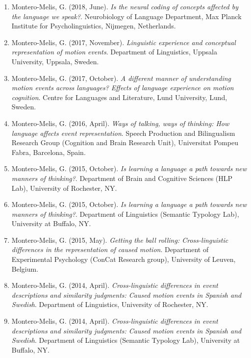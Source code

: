 \documentclass[margin, 11pt]{res} %
\begin{document}
\begin{resume}
\begin{enumerate}
\item Montero-Melis, G. (2018, June). \textit{Is the neural coding of concepts affected by the language we speak?}. Neurobiology of Language Department, Max Planck Institute for Psycholinguistics, Nijmegen, Netherlands.

\item Montero-Melis, G. (2017, November). \textit{Linguistic experience and conceptual representation of motion events}. Department of Linguistics, Uppsala University, Uppsala, Sweden.

\item Montero-Melis, G. (2017, October). \textit{A different manner of understanding motion events across languages? Effects of language experience on motion cognition}. Centre for Languages and Literature, Lund University, Lund, Sweden.

\item Montero-Melis, G. (2016, April). \textit{Ways of talking, ways of thinking: How language affects event representation}. Speech Production and Bilingualism Research Group (Cognition and Brain Research Unit), Universitat Pompeu Fabra, Barcelona, Spain.

\item Montero-Melis, G. (2015, October). \textit{Is learning a language a path towards new manners of thinking?}. Department of Brain and Cognitive Sciences (HLP Lab), University of Rochester, NY.

\item Montero-Melis, G. (2015, October). \textit{Is learning a language a path towards new manners of thinking?}. Department of Linguistics (Semantic Typology Lab), University at Buffalo, NY.

\item Montero-Melis, G. (2015, May). \textit{Getting the ball rolling: Cross-linguistic differences in the representation of caused motion}. Department of Experimental Psychology (ConCat Research group), University of Leuven, Belgium.

\item Montero-Melis, G. (2014, April). \textit{Cross-linguistic differences in event descriptions and similarity judgments: Caused motion events in Spanish and Swedish}. Department of Linguistics, University of Rochester, NY.

\item Montero-Melis, G. (2014, April). \textit{Cross-linguistic differences in event descriptions and similarity judgments: Caused motion events in Spanish and Swedish}. Department of Linguistics (Semantic Typology Lab), University at Buffalo, NY.


\end{enumerate}
\end{resume}
\end{document}
